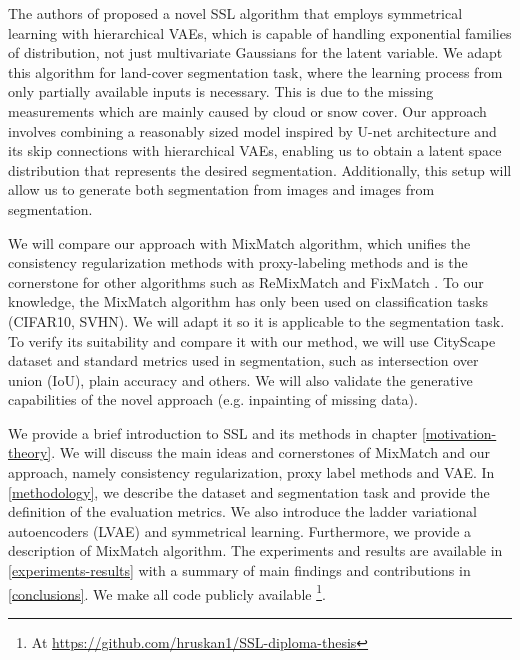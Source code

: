 The authors of \cite{sym-learning-2023} proposed a novel SSL algorithm that employs symmetrical learning with hierarchical VAEs, which is capable of
handling exponential families of distribution, not just multivariate Gaussians for the latent variable. We adapt this algorithm for  
land-cover segmentation task, where the learning process from only partially available inputs is necessary. This is due to the missing measurements 
which are mainly caused by cloud or snow cover. 
Our approach involves combining a reasonably sized model inspired by U-net architecture and its skip connections\cite{unet-2015} with hierarchical VAEs, enabling
us to obtain a latent space distribution that represents the desired segmentation. Additionally, this setup will allow us to generate both segmentation from images 
and images from segmentation.

We will compare our approach with MixMatch \cite{mixmatch-2019} algorithm, which unifies the consistency regularization methods with proxy-labeling
methods \cite{ssl-overview-2020} and is the cornerstone for other algorithms such as ReMixMatch \cite{remixmatch-2020} and FixMatch \cite{fixmatch-2020}.
To our knowledge, the MixMatch algorithm has only been used on classification tasks (CIFAR10, SVHN). We will adapt it so it is applicable
to the segmentation task. To verify its suitability and compare it with our method, we will use CityScape dataset and standard metrics used in 
segmentation, such as intersection over union (IoU), plain accuracy  and others. We will also validate the generative capabilities of the novel approach (e.g. 
inpainting of missing data).

We provide a brief introduction to SSL and its methods in chapter \ref{motivation-theory}. We will discuss the main ideas and cornerstones of 
MixMatch and our approach, namely consistency regularization, proxy label methods and VAE. In \ref{methodology}, we describe the dataset and 
segmentation task and provide the definition of the evaluation metrics. We also introduce the ladder variational autoencoders (LVAE) and 
symmetrical learning. Furthermore, we provide a description of MixMatch algorithm. The experiments and results are available in 
\ref{experiments-results} with a summary of main findings and contributions in \ref{conclusions}. We make all code publicly available
\footnote[2]{At \url{https://github.com/hruskan1/SSL-diploma-thesis}}. 



